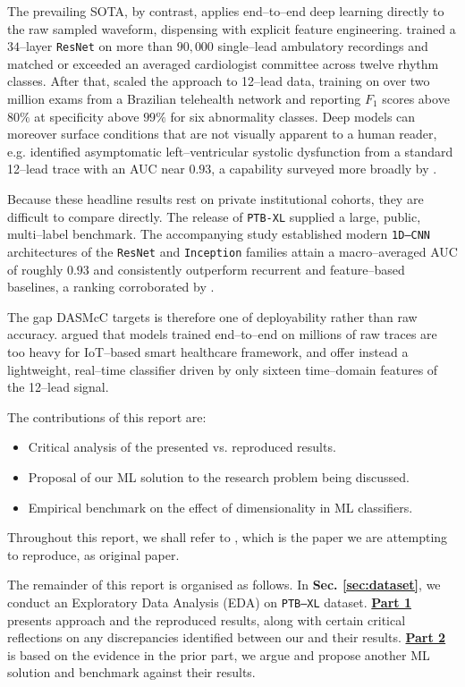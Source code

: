 The prevailing SOTA, by contrast, applies end–to–end deep learning directly to the raw sampled waveform, dispensing with explicit feature engineering.
\cite{hannun2019cardiologist} trained a $34$–layer \texttt{ResNet} on more than $90{,}000$ single–lead ambulatory recordings and matched or exceeded an averaged cardiologist committee across twelve rhythm classes.
After that, \cite{ribeiro2020automatic} scaled the approach to 12–lead data, training on over two million exams from a Brazilian telehealth network and reporting $F_1$ scores above $80\%$ at specificity above $99\%$ for six abnormality classes.
Deep models can moreover surface conditions that are not visually apparent to a human reader, e.g. \cite{attia2019screening} identified asymptomatic left–ventricular systolic dysfunction from a standard 12–lead trace with an AUC near $0.93$, a capability surveyed more broadly by \cite{siontis2021ai}.

Because these headline results rest on private institutional cohorts, they are difficult to compare directly.
The release of \texttt{PTB-XL} \cite{wagner2020ptbxl} supplied a large, public, multi–label benchmark.
The accompanying study \cite{strodthoff2021ptbxl} established modern \texttt{1D–CNN} architectures of the \texttt{ResNet} and \texttt{Inception} families attain a macro–averaged AUC of roughly $0.93$ and consistently outperform recurrent and feature–based baselines, a ranking corroborated by \cite{smigiel2021ecg}.

The gap DASMcC targets is therefore one of deployability rather than raw accuracy.
\cite{sinha2023dasmcc} argued that models trained end–to–end on millions of raw traces are too heavy for IoT–based smart healthcare framework, and offer instead a lightweight, real–time classifier driven by only sixteen time–domain features of the 12–lead signal.

The contributions of this report are:
\begin{itemize}
    \item Critical analysis of the presented \cite{sinha2023dasmcc} vs. reproduced results.
    \item Proposal of our ML solution to the research problem being discussed.
    \item Empirical benchmark on the effect of dimensionality in ML classifiers.
\end{itemize}
Throughout this report, we shall refer to \cite{sinha2023dasmcc}, which is the paper we are attempting to reproduce, as original paper.

The remainder of this report is organised as follows. In \textbf{Sec. \ref{sec:dataset}}, we conduct an Exploratory Data Analysis (EDA) on \texttt{PTB–XL} dataset.
\hyperref[sec:part_1]{\textbf{Part 1}} presents approach and the reproduced results, along with certain critical reflections on any discrepancies identified between our and their results.
\hyperref[sec:part_2]{\textbf{Part 2}} is based on the evidence in the prior part, we argue and propose another ML solution and benchmark against their results.
